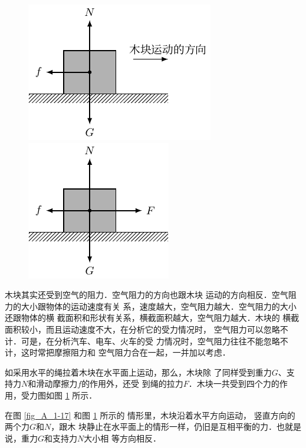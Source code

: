 \begin{figure} [htp]\centering
	\begin{minipage} [t]{0.48\textwidth} 
		\centering
		\includegraphics{fig/A/1-17.pdf} 
		\caption{} \label{fig_A_1-17} 
	\end{minipage} 
	\begin{minipage} [t]{0.48\textwidth} 
		\centering
		\includegraphics{fig/A/1-18.pdf} 
		\caption{} \label{fig_A_1-18} 
	\end{minipage} 
\end{figure} 

    木块其实还受到空气的阻力．空气阻力的方向也跟木块
运动的方向相反．空气阻力的大小跟物体的运动速度有关
系，速度越大，空气阻力越大．空气阻力的大小还跟物体的横
截面积和形状有关系，横截面积越大，空气阻力越大．木块的
横截面积较小，而且运动速度不大，在分析它的受力情况时，
空气阻力可以忽略不计．可是，在分析汽车、电车、火车的受
力情况时，空气阻力往往不能忽略不计，这时常把摩擦阻力和
空气阻力合在一起，一并加以考虑．

    如采用水平的绳拉着木块在水平面上运动，那么，木块除
了同样受到重力$G$、支持力$N$和滑动摩擦力$f$的作用外，还受
到绳的拉力$F$．木块一共受到四个力的作用，受力图如图 \ref{fig_A_1-18} 所示．

    在图 \ref{fig_A_1-17} 和图 \ref{fig_A_1-18} 所示的
情形里，木块沿着水平方向运动，
竖直方向的两个力$G$和$N$，跟木
块静止在水平面上的情形一样，仍旧是互相平衡的力．也就是说，重力$G$和支持力$N$大小相
等方向相反．



